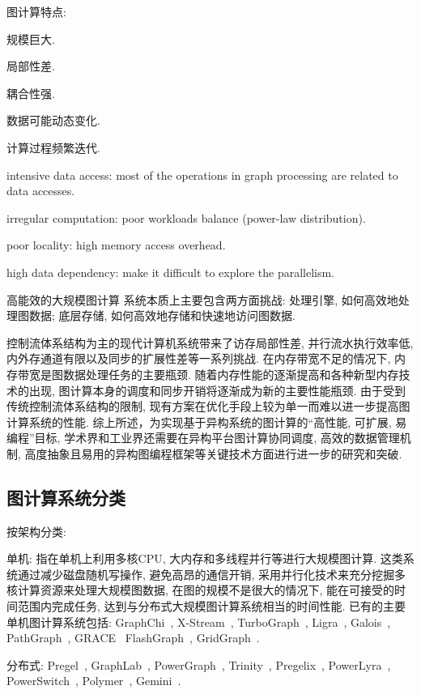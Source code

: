 \documentclass[UTF8,12pt,a4paper]{article}
\begin{document}
图计算特点:
\begin{compactitem}
  \item 规模巨大.
  \item 局部性差.
  \item 耦合性强.
  \item 数据可能动态变化.
  \item 计算过程频繁迭代.
  \item intensive data access:
  most of the operations in graph processing are related to data accesses.
  \item irregular computation: poor workloads balance (power-law distribution).
  \item poor locality: high memory access overhead.
  \item high data dependency: make it difficult to explore the parallelism.
\end{compactitem}

高能效的大规模图计算
系统本质上主要包含两方面挑战:
处理引擎, 如何高效地处理图数据;
底层存储, 如何高效地存储和快速地访问图数据.

控制流体系结构为主的现代计算机系统带来了访存局部性差, 并行流水执行效率低,
内外存通道有限以及同步的扩展性差等一系列挑战.
在内存带宽不足的情况下, 内存带宽是图数据处理任务的主要瓶颈.
随着内存性能的逐渐提高和各种新型内存技术的出现,
图计算本身的调度和同步开销将逐渐成为新的主要性能瓶颈.
由于受到传统控制流体系结构的限制,
现有方案在优化手段上较为单一而难以进一步提高图计算系统的性能.
综上所述，为实现基于异构系统的图计算的``高性能, 可扩展, 易编程''目标,
学术界和工业界还需要在异构平台图计算协同调度, 高效的数据管理机制,
高度抽象且易用的异构图编程框架等关键技术方面进行进一步的研究和突破.

\subsection{图计算系统分类}
按架构分类:
\begin{compactitem}
  \item 单机: 指在单机上利用多核CPU, 大内存和多线程并行等进行大规模图计算.
  这类系统通过减少磁盘随机写操作, 避免高昂的通信开销,
  采用并行化技术来充分挖掘多核计算资源来处理大规模图数据,
  在图的规模不是很大的情况下, 能在可接受的时间范围内完成任务,
  达到与分布式大规模图计算系统相当的时间性能.
  已有的主要单机图计算系统包括: GraphChi~\cite{DBLP:conf/osdi/KyrolaBG12},
  X-Stream~\cite{DBLP:conf/sosp/RoyMZ13},
  TurboGraph~\cite{DBLP:conf/kdd/HanLPL0KY13},
  Ligra~\cite{DBLP:conf/ppopp/ShunB13},
  Galois~\cite{DBLP:conf/sosp/NguyenLP13},
  PathGraph~\cite{DBLP:conf/sc/YuanZXJLL14},
  GRACE~\cite{DBLP:conf/cidr/WangXDG13}
  FlashGraph~\cite{DBLP:conf/fast/ZhengMBVPS15},
  GridGraph~\cite{DBLP:conf/usenix/ZhuHC15}.
  \item 分布式: Pregel~\cite{DBLP:conf/sigmod/MalewiczABDHLC10},
  GraphLab~\cite{DBLP:journals/pvldb/LowGKBGH12},
  PowerGraph~\cite{DBLP:conf/osdi/GonzalezLGBG12},
  Trinity~\cite{DBLP:conf/sigmod/ShaoWL13},
  Pregelix~\cite{DBLP:journals/pvldb/BuBJCC14},
  PowerLyra~\cite{DBLP:conf/eurosys/ChenSCC15},
  PowerSwitch~\cite{DBLP:conf/ppopp/XieCGZC15},
  Polymer~\cite{DBLP:conf/ppopp/ZhangCC15},
  Gemini~\cite{DBLP:conf/osdi/ZhuCZM16}.
\end{compactitem}
\end{document}
